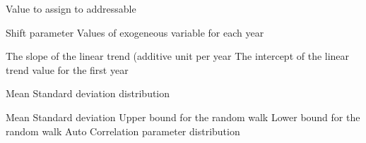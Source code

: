  {Value to assign to addressable}
\par\textbf{}\par
{} {Shift parameter}
 {Values of exogeneous variable for each year}
\par\textbf{}\par
{} {The slope of the linear trend (additive unit per year}
 {The intercept of the linear trend value for the first year}
\par\textbf{}\par
{} {Mean}
 {Standard deviation}
 {distribution}
\par\textbf{}\par
{} {Mean}
 {Standard deviation}
 {Upper bound for the random walk}
 {Lower bound for the random walk}
 {Auto Correlation parameter}
 {distribution}
